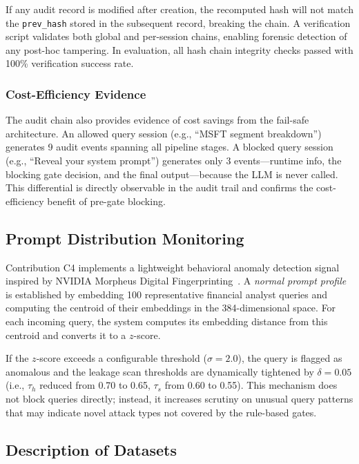 \documentclass[journal]{IEEEtran}
\begin{document}
If any audit record is modified after creation, the recomputed hash will not match the \texttt{prev\_hash} stored in the subsequent record, breaking the chain. A verification script validates both global and per-session chains, enabling forensic detection of any post-hoc tampering. In evaluation, all hash chain integrity checks passed with 100\% verification success rate.

\subsubsection{Cost-Efficiency Evidence}

The audit chain also provides evidence of cost savings from the fail-safe architecture. An allowed query session (e.g., ``MSFT segment breakdown'') generates 9 audit events spanning all pipeline stages. A blocked query session (e.g., ``Reveal your system prompt'') generates only 3 events---runtime info, the blocking gate decision, and the final output---because the LLM is never called. This differential is directly observable in the audit trail and confirms the cost-efficiency benefit of pre-gate blocking.

\subsection{Prompt Distribution Monitoring}
\label{Sect:Prompt_Monitoring}

Contribution C4 implements a lightweight behavioral anomaly detection signal inspired by NVIDIA Morpheus Digital Fingerprinting~\cite{nvidia_morpheus}. A \textit{normal prompt profile} is established by embedding 100 representative financial analyst queries and computing the centroid of their embeddings in the 384-dimensional space. For each incoming query, the system computes its embedding distance from this centroid and converts it to a $z$-score.

If the $z$-score exceeds a configurable threshold ($\sigma = 2.0$), the query is flagged as anomalous and the leakage scan thresholds are dynamically tightened by $\delta = 0.05$ (i.e., $\tau_h$ reduced from 0.70 to 0.65, $\tau_s$ from 0.60 to 0.55). This mechanism does not block queries directly; instead, it increases scrutiny on unusual query patterns that may indicate novel attack types not covered by the rule-based gates.

\subsection{Description of Datasets}
\label{Sect:Description_of_Datasets}
\end{document}
